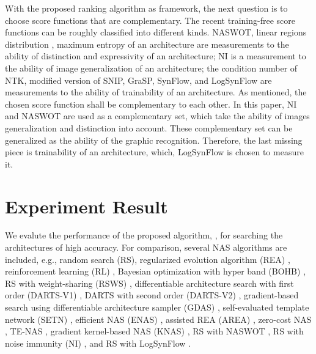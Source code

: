 \documentclass[sigconf]{acmart}
\begin{document}
    With the proposed ranking algorithm as framework, the next question is 
    to choose score functions that are complementary. The recent training-free 
    score functions can be roughly classified into different kinds. NASWOT, 
    linear regions distribution \cite{https://doi.org/10.48550/arxiv.2102.11535} \cite{lin2021zennas}, 
    maximum entropy of an architecture \cite{sun2022maedet} are measurements 
    to the ability of distinction and expressivity of an architecture; 
    NI is a measurement to the ability of image generalization of an architecture; 
    the condition number of NTK, modified version of SNIP, GraSP, SynFlow, and 
    LogSynFlow are measurements to the ability of trainability of an architecture. 
    As mentioned, the chosen score function shall be complementary to each other. 
    In this paper, NI and NASWOT are used as a complementary set, which take 
    the ability of images generalization and distinction into account. 
    These complementary set can be generalized as the ability of the graphic 
    recognition. Therefore, the last missing piece is trainability of an 
    architecture, which, LogSynFlow is chosen to measure it. 

    \section{Experiment Result}
    \label{sec:results}

    We evalute the performance of the proposed algorithm, \palg, 
    for searching the architectures of high accuracy. For comparison, several NAS 
    algorithms are included, e.g., random search (RS), regularized evolution algorithm 
    (REA) \cite{real2019regularized}, reinforcement learning (RL) \cite{Williams:92}, 
    Bayesian optimization with hyper band (BOHB) \cite{falkner2018bohb}, RS with 
    weight-sharing (RSWS) \cite{li2019random}, differentiable architecture search 
    with first order (DARTS-V1) \cite{liu2019darts}, DARTS with second order 
    (DARTS-V2) \cite{liu2019darts}, gradient-based search using differentiable 
    architecture sampler (GDAS) \cite{dong2019searching}, self-evaluated template 
    network (SETN) \cite{Dong_2019}, efficient NAS (ENAS) \cite{pham2018efficient}, 
    assisted REA (AREA) \cite{https://doi.org/10.48550/arxiv.2006.04647}, 
    zero-cost NAS \cite{https://doi.org/10.48550/arxiv.2101.08134}, 
    TE-NAS \cite{https://doi.org/10.48550/arxiv.2102.11535}, gradient kernel-based 
    NAS (KNAS) \cite{xu2021knas}, RS with NASWOT \cite{https://doi.org/10.48550/arxiv.2006.04647}, 
    RS with noise immunity (NI) \cite{10092788}, and RS with LogSynFlow \cite{Cavagnero_2023}. 
\end{document}
